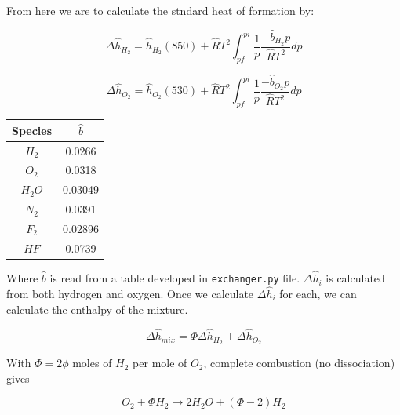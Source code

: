 \documentclass[12pt, Times New Roman]{article}
\begin{document}
    \vspace*{6pt}

    From here we are to calculate the stndard heat of formation by:
    
    \begin{equation}
        \Delta \hat{h}_{H_{2}} = \hat{h}_{H_{2}}(850) + \hat{R}T^{2}\int^{pi}_{pf} \frac{1}{p} \frac{-\hat{b}_{H_{2}}p}{\hat{R}T^{2}} dp
    \end{equation}

    \vspace*{6pt}

    \begin{equation}
        \Delta \hat{h}_{O_{2}} = \hat{h}_{O_{2}}(530) + \hat{R}T^{2}\int^{pi}_{pf} \frac{1}{p} \frac{-\hat{b}_{O_{2}}p}{\hat{R}T^{2}} dp
    \end{equation}

    \begin{center}
        \begin{tabular}{|c|c|}
            \hline
            Species & $\hat{b}$ \\
            \hline
            $H_{2}$ & 0.0266 \\
            \hline
            $O_{2}$ & 0.0318 \\
            \hline
            $H_{2}O$ & 0.03049 \\
            \hline
            $N_{2}$ & 0.0391 \\
            \hline
            $F_{2}$ & 0.02896 \\
            \hline
            $HF$ & 0.0739 \\
            \hline
        \end{tabular}
    \end{center}
    
    Where $\hat{b}$ is read from a table developed in \verb|exchanger.py| file. $\Delta \hat{h}_{i}$ is calculated from both 
    hydrogen and oxygen. Once we calculate $\Delta \hat{h}_{i}$ for each, we can calculate the enthalpy of the mixture.

    \begin{equation}
        \Delta \hat{h}_{mix} = \Phi \Delta \hat{h}_{H_{2}} + \Delta \hat{h}_{O_{2}}
    \end{equation}
    
    With $\Phi = 2\phi$ moles of $H_{2}$ per mole of $O_{2}$, complete combustion (no dissociation) gives

    \begin{equation}
        O_{2} + \Phi H_{2} \rightarrow 2H_{2}O + (\Phi-2)H_{2}
    \end{equation}
\end{document}
